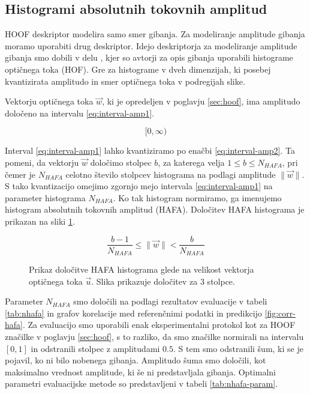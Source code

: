 \subsection{Histogrami absolutnih tokovnih amplitud}\label{sec:hafa}
HOOF deskriptor modelira samo smer gibanja. Za modeliranje amplitude gibanja moramo uporabiti drug deskriptor. Idejo deskriptorja za modeliranje amplitude gibanja smo dobili v delu \cite{pers2010histograms}, kjer so avtorji za opis gibanja uporabili histograme optičnega toka (HOF). Gre za histograme v dveh dimenzijah, ki posebej kvantizirata amplitudo in smer optičnega toka v podregijah slike. 

Vektorju optičnega toka $\vec{w}$, ki je opredeljen v poglavju \ref{sec:hoof}, ima amplitudo določeno na intervalu \eqref{eq:interval-amp1}. 

\begin{equation}\label{eq:interval-amp1}
	[0, \infty)
\end{equation}


Interval \eqref{eq:interval-amp1} lahko kvantiziramo po enačbi \eqref{eq:interval-amp2}. Ta pomeni, da vektorju $\vec{w}$ določimo stolpec $b$, za katerega velja $1 \leq b \leq N_{HAFA}$, pri čemer je $N_{HAFA}$ celotno število stolpcev histograma na podlagi amplitude $\| \vec{w} \|$. S tako kvantizacijo omejimo zgornjo mejo intervala \eqref{eq:interval-amp1} na parameter histograma $N_{HAFA}$. Ko tak histogram normiramo, ga imenujemo histogram absolutnih tokovnih amplitud (HAFA). Določitev HAFA histograma je prikazan na sliki \ref{fig:hafa-histogram}.

\begin{equation}\label{eq:interval-amp2}
	\frac{b-1}{N_{HAFA}} \leq \| \vec{w} \| < \frac{b}{N_{HAFA}}
\end{equation}




\begin{figure}[htb]
\centering

\caption[Prikaz določitve HAFA histograma glede na velikost vektorja]{Prikaz določitve HAFA histograma glede na velikost vektorja optičnega toka $\vec{u}$. Slika prikazuje določitev za $3$ stolpce.}
\label{fig:hafa-histogram}
\end{figure}





Parameter $N_{HAFA}$ smo določili na podlagi rezultatov evaluacije v tabeli \ref{tab:nhafa} in grafov korelacije med referenčnimi podatki in predikcijo \ref{fig:corr-hafa}. Za evaluacijo smo uporabili enak eksperimentalni protokol kot za HOOF značilke v poglavju \ref{sec:hoof}, s to razliko, da smo značilke normirali na intervalu $[0, 1]$ in odstranili stolpec z amplitudami $0.5$. S tem smo odstranili šum, ki se je pojavil, ko ni bilo nobenega gibanja. Amplitudo šuma smo določili, kot maksimalno vrednost amplitude, ki še ni predstavljala gibanja. Optimalni parametri evaluacijske metode so predstavljeni v tabeli \ref{tab:nhafa-param}.



